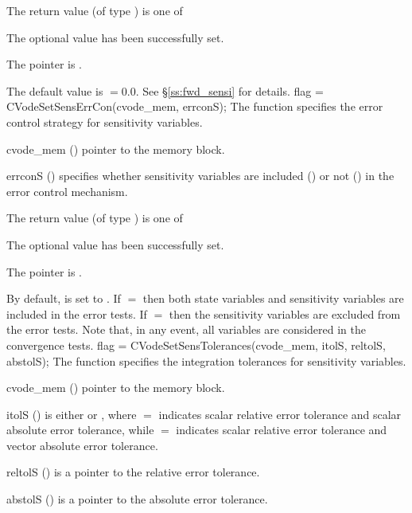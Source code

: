 {
  The return value  (of type ) is one of
  \begin{args}
  \item[\Id{SUCCESS}]
    The optional value has been successfully set.
  \item[\Id{CVS\_NO\_MEM}]
    The  pointer is .
  \end{args}
}
{
  The default value is $=0.0$. See \S\ref{ss:fwd_sensi} for
  details.
}
{
  flag = CVodeSetSensErrCon(cvode\_mem, errconS);
}
{
  The function  specifies the error control
  strategy for sensitivity variables.
}
{
  \begin{args}
  \item[cvode\_mem] ()
    pointer to the {\cvodes} memory block.
  \item[errconS] ()
    specifies whether sensitivity variables are included () or not
    () in the error control mechanism.
  \end{args}
}
{
  The return value  (of type ) is one of
  \begin{args}
  \item[\Id{SUCCESS}] 
    The optional value has been successfully set.
  \item[\Id{CVS\_NO\_MEM}]
    The  pointer is .
  \end{args}
}
{
  By default,  is set to . 
  If $=$ then both state variables and
  sensitivity variables are included in the error tests. 
  If $=$ then the sensitivity variables are excluded from the 
  error tests. Note that, in any event, all variables are considered in the convergence 
  tests.
}
{
  flag = CVodeSetSensTolerances(cvode\_mem, itolS, reltolS, abstolS);
}
{
  The function  specifies the integration tolerances for
  sensitivity variables.
}
{
  \begin{args}
  \item[cvode\_mem] ()
    pointer to the {\cvodes} memory block.
  \item[itolS]  () 
    is either  or , where $=$ indicates scalar relative error 
    tolerance and scalar absolute error tolerance, while $=$ indicates scalar
    relative error tolerance and vector absolute error tolerance. 
  \item[reltolS] ()
    is a pointer to the relative error tolerance.
  \item[abstolS] ()
    is a pointer to the absolute error tolerance.
  \end{args}
}
